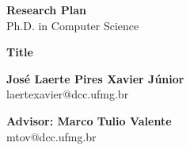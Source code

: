 {\centering

{\LARGE \textbf{Research Plan}} \\
{\large Ph.D. in Computer Science }

\vspace{170px}

{\huge \textbf{Title}} \\

\vspace{170px}


\textbf{José Laerte Pires Xavier Júnior} \\
\textrm{laertexavier@dcc.ufmg.br}

\vspace{70px}

\textbf{Advisor: Marco Tulio Valente}\\
\textrm{mtov@dcc.ufmg.br}

\vspace{25px}

}

\newpage
